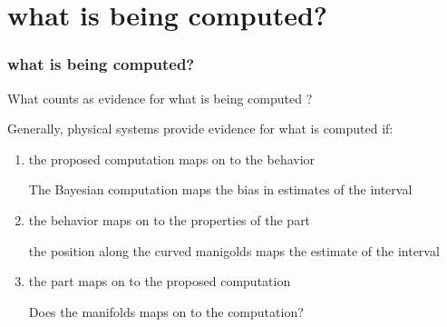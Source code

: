 \documentclass{beamer}
\begin{document}
\section{what is being computed?}
\begin{frame}
\frametitle{\textbf{what is being computed?} }
What counts as evidence for what is being computed ?

Generally, physical systems provide evidence for what is computed if:

\begin{enumerate}
    \item the proposed computation maps on to the behavior
    
    The Bayesian computation maps the bias in estimates of the interval

    \item the behavior maps on to the properties of the part
    
    the position along the curved manigolds maps the estimate of the interval

    \item the part maps on to the proposed computation
    
    Does the manifolds maps on to the computation?
\end{enumerate}

\end{frame}

\end{document}
